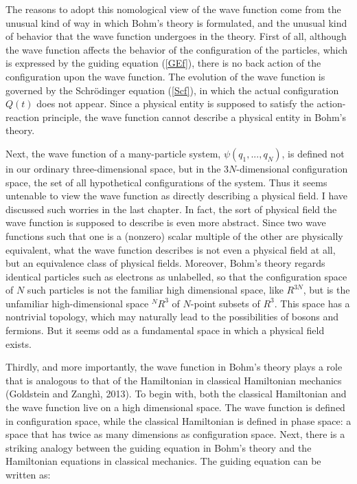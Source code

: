 The reasons to adopt this nomological view of the wave function come from the unusual kind of way in which Bohm's theory is formulated, and the unusual kind of behavior that the wave function undergoes in the theory.
First of all, although the wave function affects the behavior of the configuration of the particles, which is expressed by the guiding equation (\ref{GEf}), there is no back action of the configuration upon the wave function. The evolution of the wave function is governed by the Schr\"{o}dinger equation (\ref{Scf}), in which the actual configuration $Q(t)$ does not appear. Since a physical entity is supposed to satisfy the action-reaction principle, the wave function cannot describe a physical entity in Bohm's theory.

Next, the wave function of a many-particle system, $\psi(q_1, . . . , q_N)$, is defined not in our ordinary three-dimensional space, but in the $3N$-dimensional configuration space, the set of all hypothetical configurations of the system. Thus it seems untenable to view the wave function as directly describing a physical field. I have discussed such worries in the last chapter. In fact, the sort of physical field the wave function is supposed to describe is even more abstract. Since two wave functions such that one is a (nonzero) scalar multiple of the other are physically equivalent,  what the wave function describes is not even a physical field at all, but an equivalence class of physical fields. Moreover, Bohm's theory regards identical particles such as electrons as unlabelled, so that the configuration space of $N$ such particles is not the familiar high dimensional space, like $R^{3N}$, but is the unfamiliar high-dimensional space $^{N}R^3$ of $N$-point subsets of $R^3$. This space has a nontrivial topology, which may naturally lead to the possibilities of bosons and fermions. But it seems odd as a fundamental space in which a physical field exists.

Thirdly, and more importantly, the wave function in Bohm's theory plays a role that is analogous to that of the Hamiltonian in classical Hamiltonian mechanics (Goldstein and Zangh\`{i}, 2013). To begin with, both the classical Hamiltonian and the wave function live on a high dimensional space. The wave function is defined in configuration space, while the classical Hamiltonian is defined in phase space: a space that has twice as many dimensions as configuration space. 
Next, there is a striking analogy between the  guiding equation in Bohm's theory and the Hamiltonian equations in classical mechanics. The guiding equation can be written as:

